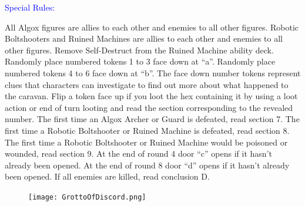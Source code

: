 \documentclass[fontsize=11pt]{scrartcl}
\begin{document}
\begin{multicols}{3}
    \begin{center}
	    {\myfont\LARGE{\textcolor{Blue}{Special Rules:}}}
		\end{center}
	  \footnotesize{All Algox figures are allies to each other and enemies to all other figures. Robotic Boltshooters and Ruined Machines are allies to each other and enemies to all other figures. Remove Self-Destruct from the Ruined Machine ability deck. Randomly place numbered tokens 1 to 3 face down at “a”. Randomly place numbered tokens 4 to 6 face down at “b”. The face down number tokens represent clues that characters can investigate to find out more about what happened to the caravan. Flip a token face up if you loot the hex containing it by using a loot action or end of turn looting and read the section corresponding to the revealed number.\newline\newline
The first time an Algox Archer or Guard is defeated, read section 7. The first time a Robotic Boltshooter or Ruined Machine is defeated, read section 8. The first time a Robotic Boltshooter or Ruined Machine would be poisoned or wounded, read section 9. At the end of round 4 door “c” opens if it hasn’t already been opened. At the end of round 8 door “d” opens if it hasn’t already been opened. If all enemies are killed, read conclusion D.}
  \end{multicols}
	\begin{figure}[b]
    \centering
		\vspace*{-6cm}
    \texttt{[image: GrottoOfDiscord.png]}
  \end{figure}
	\newpage
\end{document}
